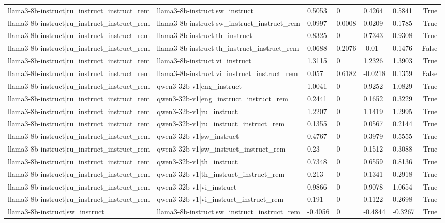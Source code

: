 \begin{table}
\begin{tabular}{llllllr}
llama3-8b-instruct|ru_instruct_instruct_rem & llama3-8b-instruct|sw_instruct & 0.5053 & 0 & 0.4264 & 0.5841 & True \\
llama3-8b-instruct|ru_instruct_instruct_rem & llama3-8b-instruct|sw_instruct_instruct_rem & 0.0997 & 0.0008 & 0.0209 & 0.1785 & True \\
llama3-8b-instruct|ru_instruct_instruct_rem & llama3-8b-instruct|th_instruct & 0.8325 & 0 & 0.7343 & 0.9308 & True \\
llama3-8b-instruct|ru_instruct_instruct_rem & llama3-8b-instruct|th_instruct_instruct_rem & 0.0688 & 0.2076 & -0.01 & 0.1476 & False \\
llama3-8b-instruct|ru_instruct_instruct_rem & llama3-8b-instruct|vi_instruct & 1.3115 & 0 & 1.2326 & 1.3903 & True \\
llama3-8b-instruct|ru_instruct_instruct_rem & llama3-8b-instruct|vi_instruct_instruct_rem & 0.057 & 0.6182 & -0.0218 & 0.1359 & False \\
llama3-8b-instruct|ru_instruct_instruct_rem & qwen3-32b-v1|eng_instruct & 1.0041 & 0 & 0.9252 & 1.0829 & True \\
llama3-8b-instruct|ru_instruct_instruct_rem & qwen3-32b-v1|eng_instruct_instruct_rem & 0.2441 & 0 & 0.1652 & 0.3229 & True \\
llama3-8b-instruct|ru_instruct_instruct_rem & qwen3-32b-v1|ru_instruct & 1.2207 & 0 & 1.1419 & 1.2995 & True \\
llama3-8b-instruct|ru_instruct_instruct_rem & qwen3-32b-v1|ru_instruct_instruct_rem & 0.1355 & 0 & 0.0567 & 0.2144 & True \\
llama3-8b-instruct|ru_instruct_instruct_rem & qwen3-32b-v1|sw_instruct & 0.4767 & 0 & 0.3979 & 0.5555 & True \\
llama3-8b-instruct|ru_instruct_instruct_rem & qwen3-32b-v1|sw_instruct_instruct_rem & 0.23 & 0 & 0.1512 & 0.3088 & True \\
llama3-8b-instruct|ru_instruct_instruct_rem & qwen3-32b-v1|th_instruct & 0.7348 & 0 & 0.6559 & 0.8136 & True \\
llama3-8b-instruct|ru_instruct_instruct_rem & qwen3-32b-v1|th_instruct_instruct_rem & 0.213 & 0 & 0.1341 & 0.2918 & True \\
llama3-8b-instruct|ru_instruct_instruct_rem & qwen3-32b-v1|vi_instruct & 0.9866 & 0 & 0.9078 & 1.0654 & True \\
llama3-8b-instruct|ru_instruct_instruct_rem & qwen3-32b-v1|vi_instruct_instruct_rem & 0.191 & 0 & 0.1122 & 0.2698 & True \\
llama3-8b-instruct|sw_instruct & llama3-8b-instruct|sw_instruct_instruct_rem & -0.4056 & 0 & -0.4844 & -0.3267 & True \\

\end{tabular}
\end{table}
